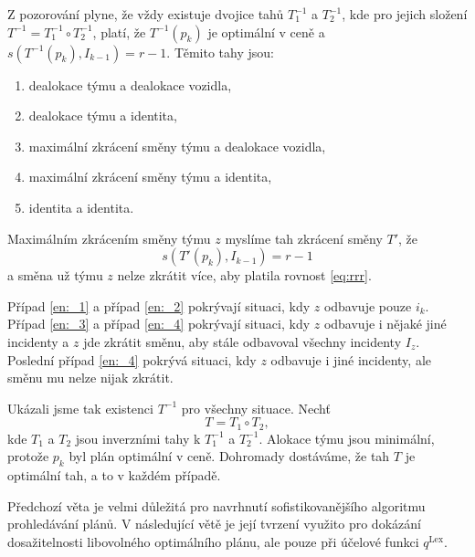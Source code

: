 \begin{dukaz}
  Z pozorování plyne, že vždy existuje dvojice tahů $T_1^{-1}$ a $T_2^{-1}$, kde pro jejich složení $T^{-1} = T_1^{-1} \circ T_2^{-1}$,
  platí, že $T^{-1}(p_k)$ je optimální v ceně a $s(T^{-1}(p_k), I_{k-1}) = r - 1$.
  Těmito tahy jsou:
  \begin{enumerate}
  \item
    dealokace týmu a dealokace vozidla, \label{en:_1}
  \item
    dealokace týmu a identita, \label{en:_2}
  \item
    maximální zkrácení směny týmu a dealokace vozidla, \label{en:_3}
  \item
    maximální zkrácení směny týmu a identita, \label{en:_4}
  \item
    identita a identita. \label{en:_5}
  \end{enumerate}
  Maximálním zkrácením směny týmu $z$ myslíme tah zkrácení směny $T'$, že
  \begin{equation}\label{eq:rrr}
    s(T'(p_k), I_{k-1}) = r - 1
  \end{equation}
  a směna už týmu $z$ nelze zkrátit více, aby platila rovnost \ref{eq:rrr}.

  Případ \ref{en:_1} a případ \ref{en:_2} pokrývají situaci, kdy $z$ odbavuje pouze $i_k$.
  Případ \ref{en:_3} a případ \ref{en:_4} pokrývají situaci, kdy $z$ odbavuje i nějaké jiné incidenty a $z$ jde zkrátit směnu, aby stále odbavoval všechny incidenty $I_z$.
  Poslední případ \ref{en:_4} pokrývá situaci, kdy $z$ odbavuje i jiné incidenty, ale směnu mu nelze nijak zkrátit.

  Ukázali jsme tak existenci $T^{-1}$ pro všechny situace. Nechť
  \begin{equation*}
    T = T_1 \circ T_2,
  \end{equation*}
  kde $T_1$ a $T_2$ jsou inverzními tahy k $T_1^{-1}$ a $T_2^{-1}$.
  Alokace týmu jsou minimální, protože $p_k$ byl plán optimální v ceně.
  Dohromady dostáváme, že tah $T$ je optimální tah, a to v každém případě.
\end{dukaz}

Předchozí věta je velmi důležitá pro navrhnutí sofistikovanějšího algoritmu prohledávání plánů.
V následující větě je její tvrzení využito pro dokázání dosažitelnosti libovolného optimálního plánu, ale pouze při účelové funkci $q^{\text{Lex}}$.

